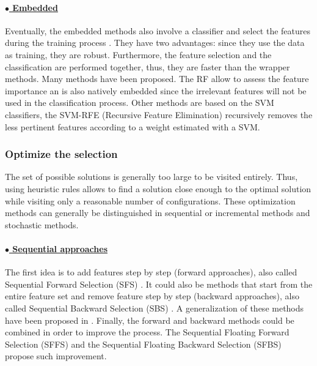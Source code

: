 \paragraph{\underline{$\bullet$ Embedded} \\}
Eventually, the embedded methods also involve a classifier and select the features during the training process \citep{tang2014feature}. They have two advantages: since they use the data as training, they are robust. Furthermore, the feature selection and the classification are performed together, thus, they are faster than the wrapper methods. Many methods have been proposed. The RF allow to assess the feature importance \citep{breiman2001random} an is also natively embedded since the irrelevant features will not be used in the classification process. Other methods are based on the SVM classifiers, the SVM-RFE (Recursive Feature Elimination) \citep{tuia2009classification} recursively removes the less pertinent features according to a weight estimated with a SVM.

\subsubsection{Optimize the selection}
The set of possible solutions is generally too large to be visited entirely. Thus, using heuristic rules allows to find a solution close enough to the optimal solution while visiting only a reasonable number of configurations. These optimization methods can generally be distinguished in sequential or incremental methods and stochastic methods.

\paragraph{\underline{$\bullet$ Sequential approaches} \\}
The first idea is to add features step by step (forward approaches), also called Sequential Forward Selection (SFS) \citep{marill1963effectiveness}. It could also be methods that start from the entire feature set and remove feature step by step (backward approaches), also called Sequential Backward Selection (SBS) \citep{whitney1971direct}. A generalization of these methods have been proposed in \cite{kittler1978feature}. Finally, the forward and backward methods could be combined in order to improve the process. The Sequential Floating Forward Selection (SFFS) and the Sequential Floating Backward Selection (SFBS) \citep{pudil1994floating} propose such improvement. \\

